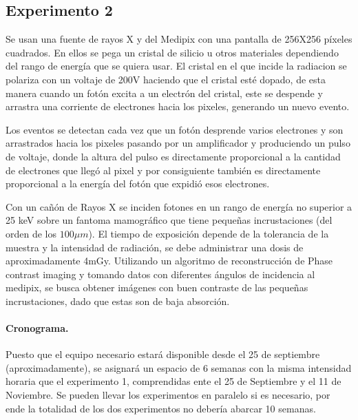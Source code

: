 \documentclass[notitlepage,letterpaper,12pt]{article} %
\begin{document}
\subsection{Experimento 2}
Se usan una fuente de rayos X y del Medipix con una pantalla de 256X256 píxeles cuadrados. En ellos se pega un cristal de silicio  u otros materiales dependiendo del rango de energía que se quiera usar. El cristal en el que incide la radiacion se polariza con un voltaje de 200V haciendo que el cristal esté dopado, de esta manera cuando un fotón excita a un electrón del cristal, este se despende y arrastra una corriente de electrones hacia los pixeles, generando un nuevo evento.


Los eventos se detectan cada vez que un fotón desprende varios electrones y son arrastrados hacia los pixeles pasando por un amplificador y produciendo un pulso de voltaje, donde la altura del pulso es directamente  proporcional a la cantidad de electrones que llegó al pixel y por consiguiente también es directamente proporcional a la energía del fotón que expidió esos electrones.


Con un cañón de Rayos X se inciden fotones en un rango de energía no superior a 25 keV sobre  un fantoma mamográfico que tiene pequeñas incrustaciones (del orden de los $100 \mu m$). El tiempo de exposición depende de la tolerancia de la muestra y la intensidad de radiación, se debe administrar una dosis de aproximadamente 4mGy. Utilizando un algoritmo de reconstrucción de Phase contrast imaging y tomando datos con diferentes ángulos de incidencia al medipix, se busca obtener imágenes con buen contraste de las pequeñas incrustaciones, dado que estas son de baja absorción.

\paragraph{Cronograma.} Puesto que el equipo necesario estará disponible desde el 25 de septiembre (aproximadamente), se asignará un espacio de 6 semanas con la misma intensidad horaria que el experimento 1, comprendidas ente el 25 de Septiembre y el 11 de Noviembre. Se pueden llevar los experimentos en paralelo si es necesario, por ende la totalidad de los dos experimentos no debería abarcar 10 semanas.

\end{document}
